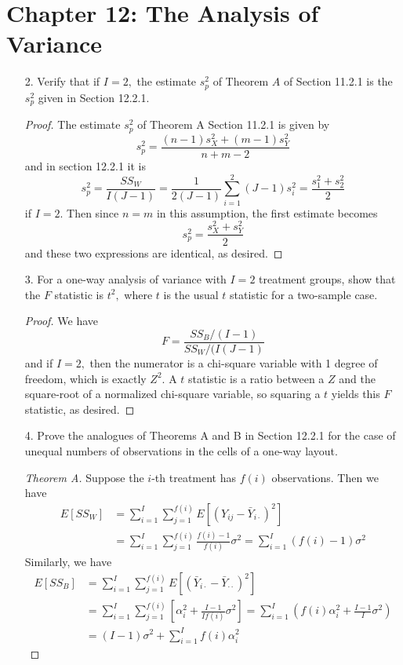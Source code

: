 \documentclass{article}
\begin{document}
\section*{Chapter 12: The Analysis of Variance}

\begin{itemize}
	\item[2.] Verify that if $I=2,$ the estimate $s_p^2$ of Theorem $A$ of Section 11.2.1 is the $s_p^2$ given in Section 12.2.1.
		\begin{proof}
			The estimate $s_p^2$ of Theorem A Section 11.2.1 is given by \[s_p^2=\frac{(n-1)s_X^2+(m-1)s_Y^2}{n+m-2}\] and in section 12.2.1 it is \[s_p^2=\frac{SS_W}{I(J-1)} = \frac{1}{2(J-1)}\sum_{i=1}^{2}(J-1)s_i^2=\frac{s_1^2+s_2^2}{2}\] if $I=2.$ Then since $n=m$ in this assumption, the first estimate becomes \[s_p^2=\frac{s_X^2+s_Y^2}{2}\] and these two expressions are identical, as desired.
		\end{proof}

	\item[3.] For a one-way analysis of variance with $I=2$ treatment groups, show that the $F$ statistic is $t^2,$ where $t$ is the usual $t$ statistic for a two-sample case.
		\begin{proof}
			We have \[F=\frac{SS_B/(I-1)}{SS_W/(I(J-1)}\] and if $I=2,$ then the numerator is a chi-square variable with 1 degree of freedom, which is exactly $Z^2.$ A $t$ statistic is a ratio between a $Z$ and the square-root of a normalized chi-square variable, so squaring a $t$ yields this $F$ statistic, as desired.
		\end{proof}

	\item[4.] Prove the analogues of Theorems A and B in Section 12.2.1 for the case of unequal numbers of observations in the cells of a one-way layout.
		\begin{proof}[Theorem A]
			Suppose the $i$-th treatment has $f(i)$ observations. Then we have
			\begin{align*}
				E[SS_W] &= \sum_{i=1}^{I} \sum_{j=1}^{f(i)}E[(Y_{ij}-\bar{Y}_{i\cdot})^2] \\
				&= \sum_{i=1}^{I} \sum_{j=1}^{f(i)}\frac{f(i)-1}{f(i)}\sigma^2 = \sum_{i=1}^{I}(f(i)-1)\sigma^2
			\end{align*}
			Similarly, we have
			\begin{align*}
				E[SS_B] &= \sum_{i=1}^{I} \sum_{j=1}^{f(i)} E[(\bar{Y}_{i\cdot} - \bar{Y}_{\cdot\cdot})^2] \\
				&= \sum_{i=1}^{I} \sum_{j=1}^{f(i)} \left[ \alpha_i^2 + \frac{I-1}{If(i)}\sigma^2 \right] = \sum_{i=1}^{I} \left(f(i)\alpha_i^2 + \frac{I-1}{I}\sigma^2\right) \\
				&= (I-1)\sigma^2 + \sum_{i=1}^{I}f(i)\alpha_i^2
			\end{align*}
		\end{proof}


\end{itemize}
\end{document}
